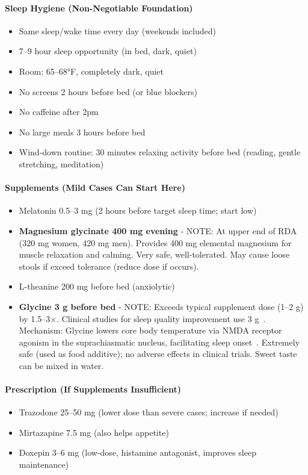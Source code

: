 \paragraph{Sleep Hygiene (Non-Negotiable Foundation)}
\begin{itemize}
    \item Same sleep/wake time every day (weekends included)
    \item 7--9 hour sleep opportunity (in bed, dark, quiet)
    \item Room: 65--68°F, completely dark, quiet
    \item No screens 2 hours before bed (or blue blockers)
    \item No caffeine after 2pm
    \item No large meals 3 hours before bed
    \item Wind-down routine: 30 minutes relaxing activity before bed (reading, gentle stretching, meditation)
\end{itemize}

\paragraph{Supplements (Mild Cases Can Start Here)}
\begin{itemize}
    \item Melatonin 0.5--3 mg (2 hours before target sleep time; start low)
    \item \textbf{Magnesium glycinate 400 mg evening} - NOTE: At upper end of RDA (320 mg women, 420 mg men). Provides 400 mg elemental magnesium for muscle relaxation and calming. Very safe, well-tolerated. May cause loose stools if exceed tolerance (reduce dose if occurs).
    \item L-theanine 200 mg before bed (anxiolytic)
    \item \textbf{Glycine 3 g before bed} - NOTE: Exceeds typical supplement dose (1--2 g) by 1.5--3$\times$. Clinical studies for sleep quality improvement use 3 g~\cite{Inagawa2006glycine}. Mechanism: Glycine lowers core body temperature via NMDA receptor agonism in the suprachiasmatic nucleus, facilitating sleep onset~\cite{Bannai2012glycine}. Extremely safe (used as food additive); no adverse effects in clinical trials. Sweet taste can be mixed in water.
\end{itemize}

\paragraph{Prescription (If Supplements Insufficient)}
\begin{itemize}
    \item Trazodone 25--50 mg (lower dose than severe cases; increase if needed)
    \item Mirtazapine 7.5 mg (also helps appetite)
    \item Doxepin 3--6 mg (low-dose, histamine antagonist, improves sleep maintenance)
\end{itemize}

